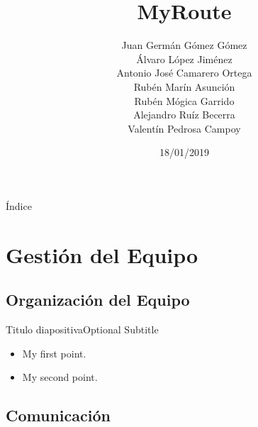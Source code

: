\documentclass{beamer}
\title{MyRoute}
\subtitle { \vspace{1cm} \color{black}Juan Germ\'an G\'omez G\'omez \\ \'Alvaro L\'opez Jim\'enez \\ Antonio Jos\'e Camarero Ortega \\ Rub\'en Mar\'in Asunci\'on \\ Rub\'en M\'ogica Garrido \\ Alejandro Ru\'iz Becerra \\ Valent\'in Pedrosa Campoy}
\date{18/01/2019}
\begin{document}
\begin{frame}
  \titlepage 
\end{frame}

\begin{frame}{\'Indice}
  \tiny 
  \tableofcontents
\end{frame}

\section{Gesti\'on del Equipo}

\subsection{Organizaci\'on del Equipo}

\begin{frame}{Titulo diapositiva}{Optional Subtitle}
  \begin{itemize}
  \item {
    My first point.
  }
  \item {
    My second point.
  }
  \end{itemize}
\end{frame}

\subsection{Comunicaci\'on}
\end{document}
